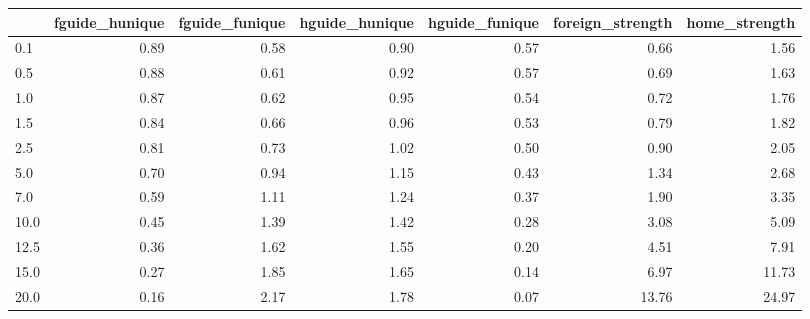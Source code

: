 \begin{tabular}{lrrrrrr}
\toprule
 & fguide_hunique & fguide_funique & hguide_hunique & hguide_funique & foreign_strength & home_strength \\
\midrule
0.1 & 0.89 & 0.58 & 0.90 & 0.57 & 0.66 & 1.56 \\
0.5 & 0.88 & 0.61 & 0.92 & 0.57 & 0.69 & 1.63 \\
1.0 & 0.87 & 0.62 & 0.95 & 0.54 & 0.72 & 1.76 \\
1.5 & 0.84 & 0.66 & 0.96 & 0.53 & 0.79 & 1.82 \\
2.5 & 0.81 & 0.73 & 1.02 & 0.50 & 0.90 & 2.05 \\
5.0 & 0.70 & 0.94 & 1.15 & 0.43 & 1.34 & 2.68 \\
7.0 & 0.59 & 1.11 & 1.24 & 0.37 & 1.90 & 3.35 \\
10.0 & 0.45 & 1.39 & 1.42 & 0.28 & 3.08 & 5.09 \\
12.5 & 0.36 & 1.62 & 1.55 & 0.20 & 4.51 & 7.91 \\
15.0 & 0.27 & 1.85 & 1.65 & 0.14 & 6.97 & 11.73 \\
20.0 & 0.16 & 2.17 & 1.78 & 0.07 & 13.76 & 24.97 \\
\bottomrule
\end{tabular}
